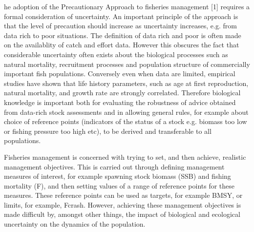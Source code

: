 \documentclass{pnastwo}
\begin{document}
\begin{article}
he adoption of the Precautionary Approach to fisheries management [1] requires a formal consideration of uncertainty. An important principle of the approach is that the level of precaution should increase as uncertainty increases, e.g. from data rich to poor situations. The definition of data rich and poor is often made on the availablity of catch and eﬀort data. However this obscures the fact that considerable uncertainty often exists about the biological processes such as natural mortality, recruitment processes and population structure of commercially important fish populations. Conversely even when data are limited, empirical studies have shown that life history parameters, such as age at first reproduction, natural mortality, and growth rate are strongly correlated. Therefore biological knowledge is important both for evaluating the robustness of advice obtained from data-rich stock assessments and in allowing general rules, for example about choice of reference points (indicators of the status of a stock e.g. biomass too low or fishing pressure too high etc), to be derived and transferable to all populations. 

Fisheries management is concerned with trying to set, and then achieve, realistic management objectives. This is carried out through defining management measures of interest, for example spawning stock biomass (SSB) and fishing mortality (F), and then setting values of a range of reference points for these measures. These reference points can be used as targets, for example BMSY, or limits, for example, Fcrash. However, achieving these management objectives is made difficult by, amongst other things, the impact of biological and ecological uncertainty on the dynamics of the population. 


\end{article}
\end{document}
